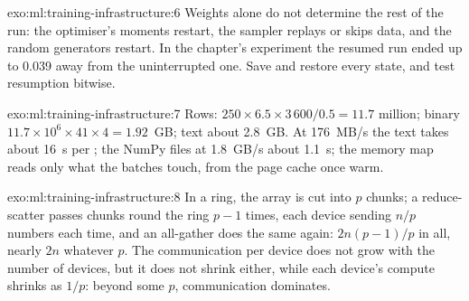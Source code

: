 \begin{solution}{exo:ml:training-infrastructure:6}
Weights alone do not determine the rest of the run: the optimiser's moments restart, the sampler replays or skips data, and the
random generators restart. In the chapter's experiment the resumed run ended up to 0.039 away from the uninterrupted one. Save and
restore every state, and test resumption bitwise.
\end{solution}

\begin{solution}{exo:ml:training-infrastructure:7}
Rows: $250\times6.5\times3\,600/0.5 = 11.7$ million; binary $11.7\times10^6\times41\times4 = 1.92$~GB; text about 2.8~GB. At 176~MB/s
the text takes about 16~s per ; the NumPy files at 1.8~GB/s about 1.1~s; the memory map reads only what the batches touch,
from the page cache once warm.
\end{solution}

\begin{solution}{exo:ml:training-infrastructure:8}
In a ring, the array is cut into $p$ chunks; a reduce-scatter passes chunks round the ring $p - 1$ times, each device sending
$n/p$ numbers each time, and an all-gather does the same again: $2n(p-1)/p$ in all, nearly $2n$ whatever $p$. The communication
per device does not grow with the number of devices, but it does not shrink either, while each device's compute shrinks as $1/p$:
beyond some $p$, communication dominates.
\end{solution}

